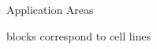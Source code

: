 \documentclass[first=dgreen,second=purple,logo=yellowexc]{aaltoslides}
\begin{document}
\begin{frame}[allowframebreaks]{Application Areas }
\begin{itemize}
\begin{center}
{            %
            }
            {\footnotesize blocks correspond to cell lines}
        \end{center}
\end{itemize}
\end{frame}
\end{document}
